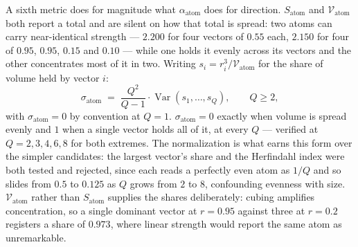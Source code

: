 \documentclass[12pt, a4paper]{article}
\begin{document}
A sixth metric does for magnitude what $\alpha_{\text{atom}}$ does
for direction. $S_{\text{atom}}$ and $\mathcal{V}_{\text{atom}}$ both
report a total and are silent on how that total is spread: two atoms can carry near-identical strength --- $2.200$ for four vectors of $0.55$ each, $2.150$ for four of $0.95$, $0.95$, $0.15$ and $0.10$ --- while one holds it evenly across its vectors and the other concentrates most of it in two. Writing $s_i = r_i^3 /
\mathcal{V}_{\text{atom}}$ for the share of volume held by vector
$i$:
\begin{equation}
    \sigma_{\text{atom}} \;=\;
    \frac{Q^2}{Q-1}\cdot\operatorname{Var}(s_1,\ldots,s_Q),
    \qquad Q\ge 2,
    \label{eq:volume_concentration}
\end{equation}
with $\sigma_{\text{atom}}=0$ by convention at $Q=1$.
$\sigma_{\text{atom}}=0$ exactly when volume is spread evenly and $1$
when a single vector holds all of it, at every $Q$ --- verified at
$Q=2,3,4,6,8$ for both extremes. The normalization is what earns this
form over the simpler candidates: the largest vector's share and the
Herfindahl index were both tested and rejected, since each reads a
perfectly even atom as $1/Q$ and so slides from $0.5$ to $0.125$ as
$Q$ grows from $2$ to $8$, confounding evenness with size.
$\mathcal{V}_{\text{atom}}$ rather than $S_{\text{atom}}$ supplies
the shares deliberately: cubing amplifies concentration, so a single
dominant vector at $r=0.95$ against three at $r=0.2$ registers a
share of $0.973$, where linear strength would report the same atom
as unremarkable.
\end{document}
